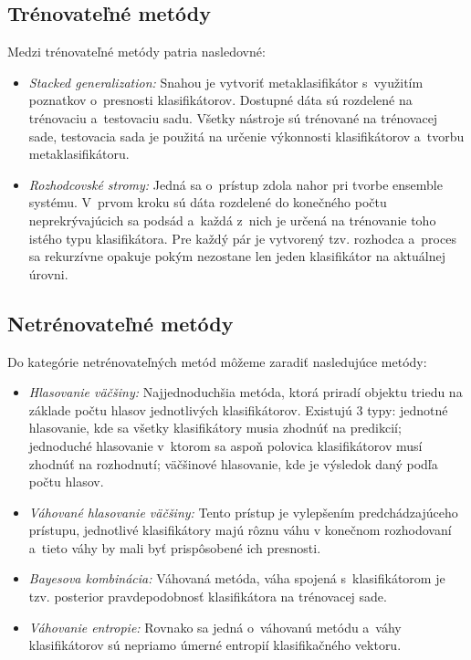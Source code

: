 \subsection{Trénovateľné metódy}
Medzi trénovateľné metódy patria nasledovné:
\begin{itemize}
	\item \textit{Stacked generalization:} Snahou je vytvoriť metaklasifikátor s~využitím poznatkov o~presnosti klasifikátorov. Dostupné dáta sú rozdelené na trénovaciu a~testovaciu sadu. Všetky nástroje sú trénované na trénovacej sade, testovacia sada je použitá na určenie výkonnosti klasifikátorov a~tvorbu metaklasifikátoru.
	\item \textit{Rozhodcovské stromy:} Jedná sa o~prístup zdola nahor pri tvorbe ensemble systému. V~prvom kroku sú dáta rozdelené do konečného počtu neprekrývajúcich sa podsád a~každá z~nich je určená na trénovanie toho istého typu klasifikátora. Pre každý pár je vytvorený tzv. rozhodca a~proces sa rekurzívne opakuje pokým nezostane len jeden klasifikátor na aktuálnej úrovni. 
\end{itemize}

\subsection{Netrénovateľné metódy}

Do kategórie netrénovateľných metód môžeme zaradiť nasledujúce metódy:
\begin{itemize}
	\item \textit{Hlasovanie väčšiny:} Najjednoduchšia metóda, ktorá priradí objektu triedu na základe počtu hlasov jednotlivých klasifikátorov. Existujú 3 typy: jednotné hlasovanie, kde sa všetky klasifikátory musia zhodnúť na predikcií; jednoduché hlasovanie v~ktorom sa aspoň polovica klasifikátorov musí zhodnúť na rozhodnutí; väčšinové hlasovanie, kde je výsledok daný podľa počtu hlasov.
	\item \textit{Váhované hlasovanie väčšiny:} Tento prístup je vylepšením predchádzajúceho prístupu, jednotlivé klasifikátory majú rôznu váhu v konečnom rozhodovaní a~tieto váhy by mali byť prispôsobené ich presnosti.
	\item \textit{Bayesova kombinácia:} Váhovaná metóda, váha spojená s~klasifikátorom je tzv. posterior pravdepodobnosť klasifikátora na trénovacej sade.
	\item \textit{Váhovanie entropie:} Rovnako sa jedná o~váhovanú metódu a~váhy klasifikátorov sú nepriamo úmerné entropií klasifikačného vektoru.
\end{itemize}


